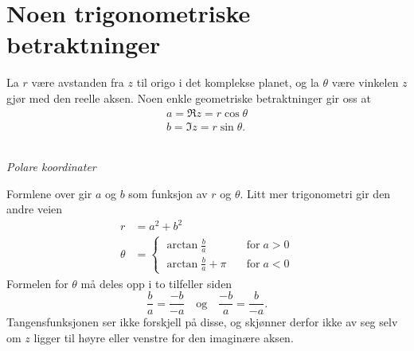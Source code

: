 \section*{Noen trigonometriske betraktninger}
La $r$ være avstanden fra $z$ til origo i det komplekse planet, 
og la $\theta$ være vinkelen $z$ gjør med den reelle aksen. 
Noen enkle geometriske betraktninger gir oss at 
\begin{align*}
a=\Re z = r\cos \theta \\
b=\Im z = r\sin \theta.
\end{align*}
\begin{center}
\\
{\small \textit{Polare koordinater}}
\end{center}
Formlene over gir $a$ og $b$ som funksjon av $r$ og $\theta$. 
Litt mer trigonometri gir den andre veien
\begin{align*}
r&=a^2+b^2 \\
\theta&= \begin{cases} \arctan \frac{b}{a} \quad &\text{for}\; a>0\\ \arctan \frac{b}{a} + \pi \quad &\text{for}\;  a<0 \end{cases}
\end{align*}
Formelen for $\theta$ må deles opp i to tilfeller siden
\[
\frac{b}{a}=\frac{-b}{-a} \quad \text{og} \quad \frac{-b}{a}=\frac{b}{-a}.
\]
 Tangensfunksjonen ser ikke forskjell på disse, 
 og skjønner derfor ikke av seg selv om $z$ ligger til høyre eller venstre for den imaginære aksen. 
 
